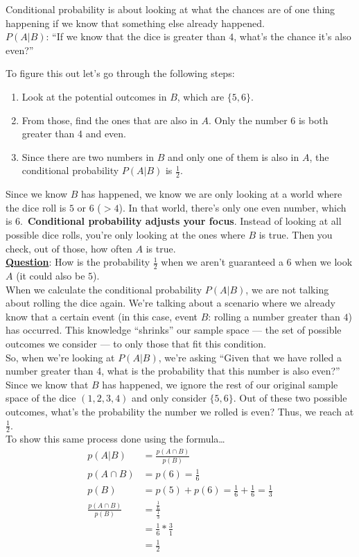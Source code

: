 \documentclass{mlnotes}
\begin{document}
Conditional probability is about looking at what the chances are of one thing
happening if we know that something else already happened.
\\[12pt]
\(P(A|B)\): ``If we know that the dice is greater than \(4\), what's the chance
it's also even?''

To figure this out let's go through the following steps:
\begin{enumerate}
  \item Look at the potential outcomes in \(B\), which are \(\{5, 6\}\).
  \item From those, find the ones that are also in \(A\). Only the number \(6\)
  is both greater than 4 and even.
  \item Since there are two numbers in \(B\) and only one of them is also in
  \(A\), the conditional probability \(P(A|B)\) is \(\frac{1}{2}\).
\end{enumerate}

Since we know \(B\) has happened, we know we are only looking at a world where
the dice roll is \(5\) or \(6\) (\(> 4\)). In that world, there's only one even
number, which is 6.\ \textbf{Conditional probability adjusts your focus}.
Instead of looking at all possible dice rolls, you're only looking at the ones
where \(B\) is true. Then you check, out of those, how often \(A\) is true.
\\[12pt]
\textbf{\underline{Question}}: How is the probability \(\frac{1}{2}\) when we aren't
guaranteed a \(6\) when we look \(A\) (it could also be \(5\)).
\\[12pt]
When we calculate the conditional probability \(P(A|B)\), we are not talking
about rolling the dice again. We're talking about a scenario where we already
know that a certain event (in this case, event \(B\): rolling a number greater
than \(4\)) has occurred. This knowledge ``shrinks'' our sample space --- the
set of possible outcomes we consider --- to only those that fit this condition.
\\[12pt]
So, when we're looking at \(P(A|B)\), we're asking ``Given that we have rolled a
number greater than 4, what is the probability that this number is also even?''
\\[12pt]
Since we know that \(B\) has happened, we ignore the rest of our original sample
space of the dice \((1,2,3,4)\) and only consider \(\{5,6\}\). Out of these two
possible outcomes, what's the probability the number we rolled is even? Thus, we
reach at \(\frac{1}{2}\).
\\[12pt]
To show this same process done using the formula\ldots
\begin{align*}
  p(A|B) &= \frac{p(A \cap B)}{p(B)}\\
  p(A \cap B) &= p(6) = \frac{1}{6}\\
  p(B) &= p(5) + p(6) = \frac{1}{6} + \frac{1}{6} = \frac{1}{3}\\
  \frac{p(A \cap B)}{p(B)} &= \frac{\frac{1}{6}}{\frac{1}{3}}\\
                           &= \frac{1}{6} * \frac{3}{1}\\ 
                           &= \frac{1}{2}
\end{align*}
\end{document}
